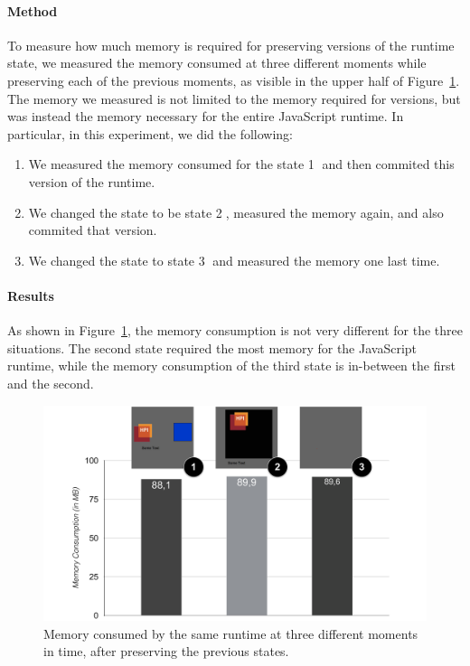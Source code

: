 \paragraph{Method}
To measure how much memory is required for preserving versions of the runtime state, we measured the memory consumed at three different moments while preserving each of the previous moments, as visible in the upper half of Figure~\ref{fig:MemoryOverheadForVersions}.
The memory we measured is not limited to the memory required for versions, but was instead the memory necessary for the entire JavaScript runtime.
In particular, in this experiment, we did the following:
\begin{enumerate}
    \item We measured the memory consumed for the state \textcircled{1} and then commited this version of the runtime.
    \item We changed the state to be state \textcircled{2}, measured the memory again, and also commited that version.
    \item We changed the state to state \textcircled{3} and measured the memory one last time.
\end{enumerate}

\paragraph{Results}
As shown in Figure~\ref{fig:MemoryOverheadForVersions}, the memory consumption is not very different for the three situations.
The second state required the most memory for the JavaScript runtime, while the memory consumption of the third state is in-between the first and the second.

\begin{figure}[h]
    \centering
    \includegraphics[width=\textwidth]{figures/6_evaluation/2_memoryForVersions.pdf}
    \caption{Memory consumed by the same runtime at three different moments in time, after preserving the previous states.}
    \label{fig:MemoryOverheadForVersions}
\end{figure}


